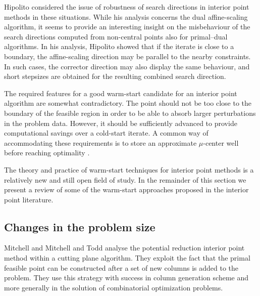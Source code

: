 Hipolito \cite{Hipolito} considered the issue of robustness of 
search directions in interior point methods in these situations.
While his analysis concerns the dual affine-scaling algorithm, 
it seems to provide an interesting insight on the misbehaviour
of the search directions computed from non-central points also
for primal--dual algorithms.
In his analysis, Hipolito showed that if the iterate is close 
to a boundary, the affine-scaling direction may be parallel to 
the nearby constraints. In such cases, the corrector direction 
may also display the same behaviour, and short stepsizes are 
obtained for the resulting combined search direction.

The required features for a good warm-start candidate for an
interior point algorithm are somewhat contradictory.
The point should not be too close to the boundary of the feasible 
region in order to be able to absorb larger perturbations in the 
problem data. 
However, it should be sufficiently advanced to provide 
computational savings over a cold-start iterate.
A common way of accommodating these requirements is to store an 
approximate $\mu$-center well before reaching optimality 
\cite{Gondzio98,GondzioGrothey03,GondzioVial,YildirimWright}.

The theory and practice of warm-start techniques for interior point 
methods is a relatively new and still open field of study.
In the remainder of this section we present a review of some 
of the warm-start approaches proposed in the interior point literature.

%
%
\subsection{Changes in the problem size}

Mitchell \cite{Mitchell88} and Mitchell and Todd \cite{MitchellTodd}
analyse the potential reduction interior point method within
a cutting plane algorithm. They exploit the fact that
the primal feasible point can be constructed after a set of new
columns is added to the problem. They use this strategy with success
in column generation scheme and more generally in the solution 
of combinatorial optimization problems.

